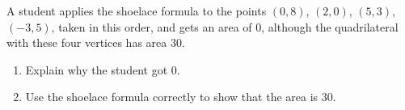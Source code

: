 A student applies the shoelace formula to the points $(0,8)$, $(2,0)$, $(5,3)$, $(-3,5)$, taken in this order, and gets an area of $0$, although the quadrilateral with these four vertices has area $30$.
\begin{enumerate}
\item[(a)] Explain why the student got $0$.
\item[(b)] Use the shoelace formula correctly to show that the area is $30$.
\end{enumerate}
